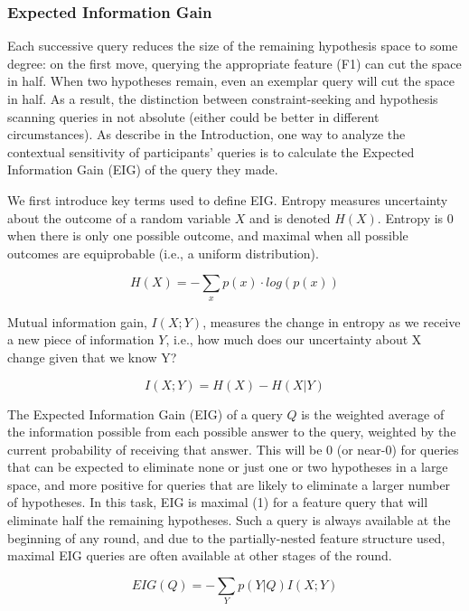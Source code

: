 \documentclass[man,floatsintext]{apa6}
\begin{document}
\subsubsection{Expected Information Gain}

Each successive query reduces the size of the remaining hypothesis space to some degree: 
on the first move, querying the appropriate feature (F1) can cut the space in half. 
When two 
hypotheses remain, even an exemplar query will cut the space in half. 
As a result, the distinction between constraint-seeking and hypothesis scanning
queries in not absolute (either could be better in different circumstances).
As describe in the Introduction, one way to analyze the contextual sensitivity 
of participants' queries is to calculate the Expected 
Information Gain (EIG) of the query they made. 

We first introduce key terms used to 
define EIG. Entropy measures uncertainty about the outcome of a random variable 
$X$ and is denoted $H(X)$. Entropy is 0 when there is only one possible outcome, and maximal when all 
possible outcomes are equiprobable (i.e., a uniform distribution).

\begin{equation}
  H(X) = -\sum_{x} p(x) \cdot log(p(x))
\end{equation}

Mutual information gain, $I(X;Y)$, measures the change in entropy as we receive a new piece 
of information $Y$, i.e., how much does our uncertainty about X change given that 
we know Y?

\begin{equation}
  I(X;Y) = H(X) - H(X|Y)
\end{equation}

The Expected Information Gain (EIG) of a query $Q$ is the weighted average of the 
information possible from each possible answer to the query, weighted by the 
current probability of receiving that answer. This will be 0 (or near-0) for queries that 
can be expected to eliminate none or just one or two hypotheses in a large space, 
and more positive for queries that are likely to eliminate a larger number of 
hypotheses. In this task, EIG is maximal (1) for a feature query that will eliminate 
half the remaining hypotheses. Such a query is always available at the beginning of 
any round, and due to the partially-nested feature structure used, maximal EIG 
queries are often available at other stages of the round.

\begin{equation}
  EIG(Q) = -\sum_{Y} p(Y|Q) I(X;Y)
\end{equation}
\end{document}
